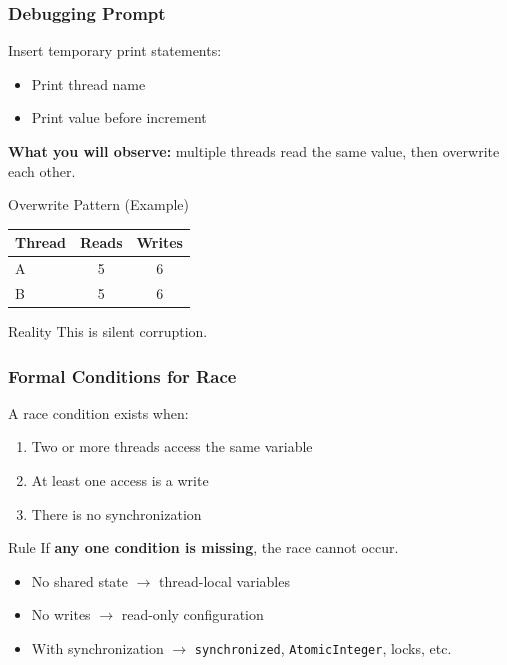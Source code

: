 \documentclass[aspectratio=169,11pt]{beamer}
\begin{document}
	\begin{frame}
		\frametitle{Debugging Prompt}
		Insert temporary print statements:
		\begin{itemize}
			\item Print thread name
			\item Print value before increment
		\end{itemize}
		\vspace{3mm}
		\textbf{What you will observe:} multiple threads read the same value, then overwrite each other.
		\vspace{4mm}
		\begin{block}{Overwrite Pattern (Example)}
			\renewcommand{\arraystretch}{1.2}
			\begin{tabular}{lcc}
				\textbf{Thread} & \textbf{Reads} & \textbf{Writes} \\
				\hline
				A & 5 & 6 \\
				B & 5 & 6 \\
			\end{tabular}
		\end{block}
		\vspace{2mm}
		\begin{block}{Reality}
			This is silent corruption.
		\end{block}
	\end{frame}
	
	\begin{frame}
		\frametitle{Formal Conditions for Race}
		A race condition exists when:
		\begin{enumerate}
			\item<+-> Two or more threads access the same variable
			\item<+-> At least one access is a write
			\item<+-> There is no synchronization
		\end{enumerate}
		\vspace{4mm}
		\begin{block}{Rule}
			If \textbf{any one condition is missing}, the race cannot occur.
		\end{block}
		\vspace{2mm}
		\begin{itemize}
			\item No shared state $\rightarrow$ thread-local variables
			\item No writes $\rightarrow$ read-only configuration
			\item With synchronization $\rightarrow$ \texttt{synchronized}, \texttt{AtomicInteger}, locks, etc.
		\end{itemize}
	\end{frame}
	
\end{document}
